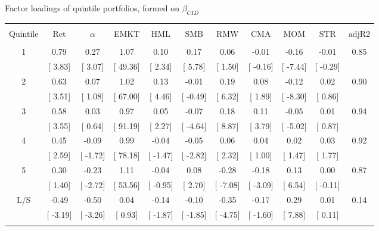 \documentclass{beamer}
\begin{document}
\subsection{}


\scriptsize
\begin{frame}{Factor loadings of quintile portfolios, formed on $\beta_{CID}$}
\vspace{-0.25cm}
\begin{table}[!htbp] \centering 
  \label{} 
\begin{tabular}{@{\extracolsep{-8pt}} ccccccccccc} 
\\[-1.8ex]\hline 
\hline \\[-1.8ex] 
Quintile & Ret & $\alpha$ & EMKT & HML & SMB & RMW & CMA & MOM & STR & adjR2 \\ 
\hline \\[-1.8ex] 
1 & 0.79 & 0.27 & 1.07 & 0.10 & 0.17 & 0.06 & -0.01 & -0.16 & -0.01 & 0.85 \\ 
 & [ 3.83] & [ 3.07] & [ 49.36] & [ 2.34] & [ 5.78] & [ 1.50] & [ -0.16] & [ -7.44] & [ -0.29] &  \\ 
2 & 0.63 & 0.07 & 1.02 & 0.13 & -0.01 & 0.19 & 0.08 & -0.12 & 0.02 & 0.90 \\ 
 & [ 3.51] & [ 1.08] & [ 67.00] & [ 4.46] & [ -0.49] & [ 6.32] & [ 1.89] & [ -8.30] & [ 0.86] &  \\ 
3 & 0.58 & 0.03 & 0.97 & 0.05 & -0.07 & 0.18 & 0.11 & -0.05 & 0.01 & 0.94 \\ 
 & [ 3.55] & [ 0.64] & [ 91.19] & [ 2.27] & [ -4.64] & [ 8.87] & [ 3.79] & [ -5.02] & [ 0.87] &  \\ 
4 & 0.45 & -0.09 & 0.99 & -0.04 & -0.05 & 0.06 & 0.04 & 0.02 & 0.03 & 0.92 \\ 
 & [ 2.59] & [ -1.72] & [ 78.18] & [ -1.47] & [ -2.82] & [ 2.32] & [ 1.00] & [ 1.47] & [ 1.77] &  \\ 
5 & 0.30 & -0.23 & 1.11 & -0.04 & 0.08 & -0.28 & -0.18 & 0.13 & 0.00 & 0.87 \\ 
 & [ 1.40] & [ -2.72] & [ 53.56] & [ -0.95] & [ 2.70] & [ -7.08] & [ -3.09] & [ 6.54] & [ -0.11] &  \\ 
L/S & -0.49 & -0.50 & 0.04 & -0.14 & -0.10 & -0.35 & -0.17 & 0.29 & 0.01 & 0.14 \\ 
 & [ -3.19] & [ -3.26] & [ 0.93] & [ -1.87] & [ -1.85] & [ -4.75] & [ -1.60] & [ 7.88] & [ 0.11] &  \\ 
\hline \\[-1.8ex] 
\end{tabular} 
\end{table}
\end{frame}
\end{document}
